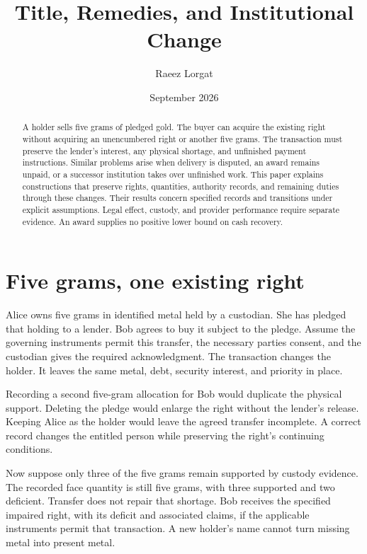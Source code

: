 \documentclass{momentum}
\title{Title, Remedies, and Institutional Change}
\author{Raeez Lorgat}
\date{September 2026}
\begin{document}
\maketitle

\begin{abstract}
A holder sells five grams of pledged gold. The buyer can acquire the existing right without acquiring an unencumbered right or another five grams. The transaction must preserve the lender's interest, any physical shortage, and unfinished payment instructions. Similar problems arise when delivery is disputed, an award remains unpaid, or a successor institution takes over unfinished work. This paper explains constructions that preserve rights, quantities, authority records, and remaining duties through these changes. Their results concern specified records and transitions under explicit assumptions. Legal effect, custody, and provider performance require separate evidence. An award supplies no positive lower bound on cash recovery.
\end{abstract}

\section{Five grams, one existing right}

Alice owns five grams in identified metal held by a custodian. She has pledged that holding to a lender. Bob agrees to buy it subject to the pledge. Assume the governing instruments permit this transfer, the necessary parties consent, and the custodian gives the required acknowledgment. The transaction changes the holder. It leaves the same metal, debt, security interest, and priority in place.

Recording a second five-gram allocation for Bob would duplicate the physical support. Deleting the pledge would enlarge the right without the lender's release. Keeping Alice as the holder would leave the agreed transfer incomplete. A correct record changes the entitled person while preserving the right's continuing conditions.

Now suppose only three of the five grams remain supported by custody evidence. The recorded face quantity is still five grams, with three supported and two deficient. Transfer does not repair that shortage. Bob receives the specified impaired right, with its deficit and associated claims, if the applicable instruments permit that transaction. A new holder's name cannot turn missing metal into present metal.
\end{document}
